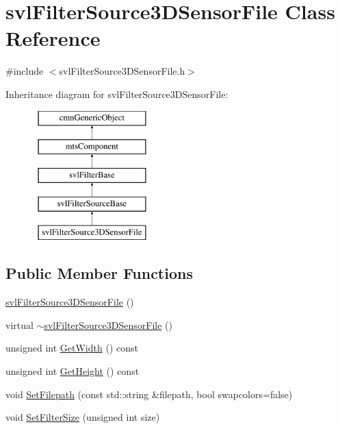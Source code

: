 \hypertarget{classsvl_filter_source3_d_sensor_file}{\section{svl\-Filter\-Source3\-D\-Sensor\-File Class Reference}
\label{classsvl_filter_source3_d_sensor_file}
}


{\ttfamily \#include $<$svl\-Filter\-Source3\-D\-Sensor\-File.\-h$>$}

Inheritance diagram for svl\-Filter\-Source3\-D\-Sensor\-File\-:\begin{figure}[H]
\begin{center}
\leavevmode
\includegraphics[height=5.000000cm]{d5/da1/classsvl_filter_source3_d_sensor_file}
\end{center}
\end{figure}
\subsection*{Public Member Functions}
\begin{DoxyCompactItemize}
\item 
\hyperlink{classsvl_filter_source3_d_sensor_file_a6788eff6e16a3736c2f711ee91d4d53e}{svl\-Filter\-Source3\-D\-Sensor\-File} ()
\item 
virtual \hyperlink{classsvl_filter_source3_d_sensor_file_a7138e29f06e2f4c62052fd26565ef501}{$\sim$svl\-Filter\-Source3\-D\-Sensor\-File} ()
\item 
unsigned int \hyperlink{classsvl_filter_source3_d_sensor_file_a695a04ddca590ff102dea09d03fffd25}{Get\-Width} () const 
\item 
unsigned int \hyperlink{classsvl_filter_source3_d_sensor_file_ae7904a9e5d2902f38ca8777b7e894e83}{Get\-Height} () const 
\item 
void \hyperlink{classsvl_filter_source3_d_sensor_file_af7b23ab150e848f1013a24bee859db71}{Set\-Filepath} (const std\-::string \&filepath, bool swapcolors=false)
\item 
void \hyperlink{classsvl_filter_source3_d_sensor_file_ab6cb64664719977309c483928ff3fd6c}{Set\-Filter\-Size} (unsigned int size)
\end{DoxyCompactItemize}
